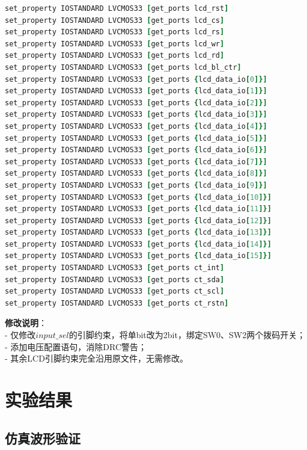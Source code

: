 \documentclass[12pt,a4paper,UTF8]{ctexart}
\begin{document}
\begin{lstlisting}[language=Tcl]
set_property IOSTANDARD LVCMOS33 [get_ports lcd_rst]
set_property IOSTANDARD LVCMOS33 [get_ports lcd_cs]
set_property IOSTANDARD LVCMOS33 [get_ports lcd_rs]
set_property IOSTANDARD LVCMOS33 [get_ports lcd_wr]
set_property IOSTANDARD LVCMOS33 [get_ports lcd_rd]
set_property IOSTANDARD LVCMOS33 [get_ports lcd_bl_ctr]
set_property IOSTANDARD LVCMOS33 [get_ports {lcd_data_io[0]}]
set_property IOSTANDARD LVCMOS33 [get_ports {lcd_data_io[1]}]
set_property IOSTANDARD LVCMOS33 [get_ports {lcd_data_io[2]}]
set_property IOSTANDARD LVCMOS33 [get_ports {lcd_data_io[3]}]
set_property IOSTANDARD LVCMOS33 [get_ports {lcd_data_io[4]}]
set_property IOSTANDARD LVCMOS33 [get_ports {lcd_data_io[5]}]
set_property IOSTANDARD LVCMOS33 [get_ports {lcd_data_io[6]}]
set_property IOSTANDARD LVCMOS33 [get_ports {lcd_data_io[7]}]
set_property IOSTANDARD LVCMOS33 [get_ports {lcd_data_io[8]}]
set_property IOSTANDARD LVCMOS33 [get_ports {lcd_data_io[9]}]
set_property IOSTANDARD LVCMOS33 [get_ports {lcd_data_io[10]}]
set_property IOSTANDARD LVCMOS33 [get_ports {lcd_data_io[11]}]
set_property IOSTANDARD LVCMOS33 [get_ports {lcd_data_io[12]}]
set_property IOSTANDARD LVCMOS33 [get_ports {lcd_data_io[13]}]
set_property IOSTANDARD LVCMOS33 [get_ports {lcd_data_io[14]}]
set_property IOSTANDARD LVCMOS33 [get_ports {lcd_data_io[15]}]
set_property IOSTANDARD LVCMOS33 [get_ports ct_int]
set_property IOSTANDARD LVCMOS33 [get_ports ct_sda]
set_property IOSTANDARD LVCMOS33 [get_ports ct_scl]
set_property IOSTANDARD LVCMOS33 [get_ports ct_rstn]
\end{lstlisting}
\textbf{修改说明}： \\
- 仅修改\(input\_sel\)的引脚约束，将单bit改为2bit，绑定SW0、SW2两个拨码开关； \\
- 添加电压配置语句，消除DRC警告； \\
- 其余LCD引脚约束完全沿用原文件，无需修改。

\section{实验结果}
\subsection{仿真波形验证}
\end{document}
